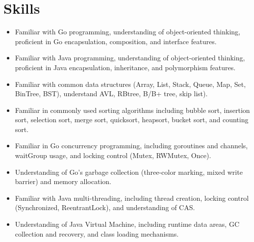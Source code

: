 \documentclass{resume}
\newcommand{\en}[1]{#1}
\newcommand{\zh}[1]{}
\begin{document}
\section{\en{Skills}\zh{技能}}
\begin{itemize}[parsep=0.25ex]
       \item \en{Familiar with Go programming, understanding of object-oriented thinking, proficient in Go encapsulation, composition, and interface features.}
            \zh{熟悉Go编程，理解面向对象思想，掌握封装、组合和接口的特性 }

       \item \en{Familiar with Java programming, understanding of object-oriented thinking, proficient in Java encapsulation, inheritance, and polymorphism features.}
                \zh{熟悉Java编程，理解面向对象思想，掌握Java封装、继承和多态特性}

      \item \en{Familiar with common data structures (Array, List, Stack, Queue, Map, Set, BinTree, BST),
                        understand AVL, RBtree, B/B+ tree, skip list).}
                \zh{熟悉常用数据结构（Array、List、Stack、Queue、Map、Set、BinTree、BST），
		       了解AVL、RBtree、B/B+树、跳表}

      \item \en{Familiar in commonly used sorting algorithms including bubble sort, insertion sort, selection sort, merge sort, quicksort, heapsort, bucket sort, and counting sort.}
              \zh{熟悉常用的排序算法(冒泡、插入、选择、归并、快排、堆排、桶、计数)}

       \item \en{Familiar in Go concurrency programming, including goroutines and channels, waitGroup usage, and locking control (Mutex, RWMutex, Once).}
            \zh{熟悉Go并发编程，协程和通道、waitGroup使用、加锁控制(Mutex、RWMutex、Once)}

       \item \en{Understanding of Go's garbage collection (three-color marking, mixed write barrier) and memory allocation.}
           \zh{了解Go的垃圾回收（三色标记、混合写屏障）、内存分配}

      \item \en{Familiar with Java multi-threading, including thread creation, locking control (Synchronized, ReentrantLock), and understanding of CAS.}
           \zh{熟悉Java多线程，线程创建、加锁控制(Synchronized、ReentrantLock)，了解CAS}

       \item \en{Understanding of Java Virtual Machine, including runtime data areas, GC collection and recovery, and class loading mechanisms.}
           \zh{了解Java虚拟机，运行时数据区域、GC回收和收集、类加载机制}


\end{itemize}
\end{document}
